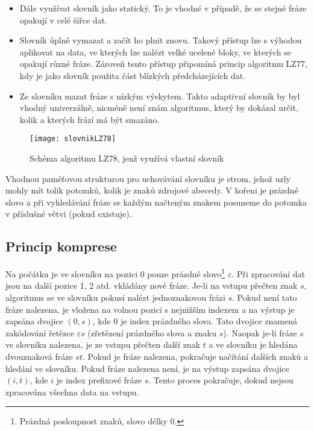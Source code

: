 \begin{itemize}
\item Dále využívat slovník jako statický. To je vhodné v případě, že se stejné fráze opakují v celé šířce dat.
\item Slovník úplně vymazat a začít ho plnit znovu. Takový přístup lze s výhodou aplikovat na data, ve kterých lze nalézt velké ucelené bloky, ve kterých se opakují různé fráze. Zároveň tento přístup připomíná princip algoritmu LZ77, kdy je jako slovník použita část blízkých předcházejících dat.
\item Ze slovníku mazat fráze s nízkým výskytem. Takto adaptivní slovník by byl vhodný univerzálně, nicméně není znám algoritmus, který by dokázal určit, kolik a kterých frází má být smazáno.
\end{itemize}

\begin{figure}[!htb]
\centering
\texttt{[image: slovnikLZ78]}
\caption{Schéma algoritmu LZ78, jenž využívá vlastní slovník}
\label{slovnikLZ78}
\end{figure}

Vhodnou paměťovou strukturou pro uchovávání slovníku je strom, jehož uzly mohly mít tolik potomků, kolik je znaků zdrojové abecedy. V kořeni je prázdné slovo a při vyhledávání fráze se každým načteným znakem posuneme do potomka v příslušné větvi (pokud existuje).

\subsection{Princip komprese}
Na počátku je ve slovníku na pozici 0 pouze prázdné slovo\footnote{Prázdná posloupnost znaků, slovo délky 0.} $\varepsilon$. Při zpracování dat jsou na další pozice 1, 2 atd. vkládány nové fráze. Je-li na vstupu přečten znak $s$, algoritmus se ve slovníku pokusí nalézt jednoznakovou frázi $s$. Pokud není tato fráze nalezena, je vložena na volnou pozici s nejnižším indexem a na výstup je zapsána dvojice $(0,s)$, kde 0 je index prázdného slova. Tato dvojice znamená zakódování řetězce $\varepsilon s$ (zřetězení prázdného slova a znaku $s$). Naopak je-li fráze $s$ ve slovníku nalezena, je ze vstupu přečten další znak $t$ a ve slovníku je hledána dvouznaková fráze $st$. Pokud je fráze nalezena, pokračuje načítání dalších znaků a hledání ve slovníku. Pokud fráze nalezena není, je na výstup zapsána dvojice $(i,t)$, kde $i$ je index prefixové fráze $s$. Tento proces pokračuje, dokud nejsou zpracována všechna data na vstupu.

